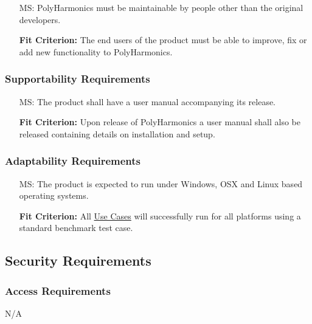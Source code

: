 \documentclass[12pt]{article}
\newcounter{masnum}
\newcounter{secunum}
\newcommand{\progname}{PolyHarmonics}
\begin{document}
\noindent \begin{itemize}
\item[MS\refstepcounter{masnum}\themasnum\label{NF_mas1}:] \progname{} must be
  maintainable by people other than the original developers.

  \textbf{Fit Criterion:} The end users of the product must be able to improve,
  fix or add new functionality to \progname{}.

\end{itemize}

\subsubsection{Supportability Requirements}

\noindent \begin{itemize}
\item[MS\refstepcounter{masnum}\themasnum\label{NF_SR1}:] The product shall have
  a user manual accompanying its release.

  \textbf{Fit Criterion:} Upon release of \progname{} a user manual shall also
  be released containing details on installation and setup.
\end{itemize}

\subsubsection{Adaptability Requirements}

\noindent \begin{itemize}
\item[MS\refstepcounter{masnum}\themasnum\label{NF_AR1}:] The product is
  expected to run under Windows, OSX and Linux based operating systems.


  \textbf{Fit Criterion:} All \hyperref[UseCase]{Use Cases} will successfully
   run for all platforms using a standard benchmark test case.
\end{itemize}

\subsection{Security Requirements}

\subsubsection{Access Requirements}

N/A

\end{document}
